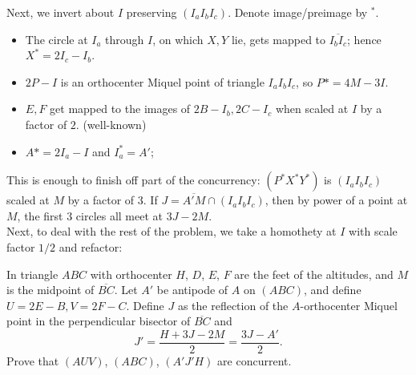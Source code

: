 \documentclass{seto}
\begin{document}
Next, we invert about $I$ preserving $(I_aI_bI_c)$. Denote image/preimage by $^*$.
\begin{itemize}
\item The circle at $I_a$ through $I$, on which $X,Y$ lie, gets mapped to $\overline{I_bI_c}$; hence $X^*=2I_c-I_b$.
\item $2P-I$ is an orthocenter Miquel point of triangle $I_aI_bI_c$, so $P*=4M-3I$.
\item $E,F$ get mapped to the images of $2B-I_b,2C-I_c$ when scaled at $I$ by a factor of $2$. (well-known)
\item $A*=2I_a-I$ and $I_a^*=A'$;
\end{itemize}
This is enough to finish off part of the concurrency: $(P^*X^*Y^*)$ is $(I_aI_bI_c)$ scaled at $M$ by a factor of $3$. 
If $J=\overline{A'M}\cap(I_aI_bI_c)$, then by power of a point at $M$, the first 3 circles all meet at $3J-2M$.\\[4pt]
Next, to deal with the rest of the problem, we take a homothety at $I$ with scale factor $1/2$ and refactor:
\begin{block}
In triangle $ABC$ with orthocenter $H$, $D$, $E$, $F$ are the feet of the altitudes, and $M$ is the midpoint of $\overline{BC}$. 
Let $A'$ be antipode of $A$ on $(ABC)$, and define $U=2E-B, V=2F-C$. 
Define $J$ as the reflection of the $A$-orthocenter Miquel point in the perpendicular bisector of $\overline{BC}$ and 
\[J'=\frac{H+3J-2M}2=\frac{3J-A'}2.\]
Prove that $(AUV)$, $(ABC)$, $(A'J'H)$ are concurrent.
\end{block}
\end{document}
